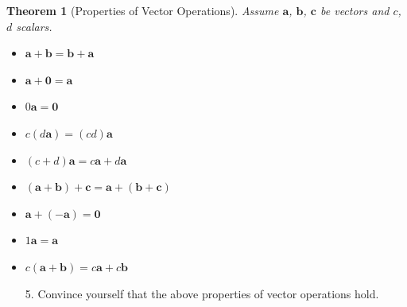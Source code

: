 \documentclass[12pt]{exam}
\newtheorem*{theorem}{Theorem}
\begin{document}
  \newpage
\begin{theorem}[Properties of Vector Operations]
    Assume $\mathbf{a}$, $\mathbf{b}$, $\mathbf{c}$ be vectors and $c$, $d$ scalars.
    \begin{multicols}{2}
        \begin{itemize}
         \item{
           $\mathbf{a}+\mathbf{b}=\mathbf{b}+\mathbf{a}$
         }
         \item{
           $\mathbf{a}+\mathbf{0}=\mathbf{a}$
         }
         \item{
           $0\mathbf{a}=\mathbf{0}$
         }
         \item{
           $c(d\mathbf{a})=(cd)\mathbf{a}$
         }
         \item{
           $(c+d)\mathbf{a}=c\mathbf{a}+d\mathbf{a}$
         }
         \item{
           $(\mathbf{a}+\mathbf{b})+\mathbf{c}=\mathbf{a}+(\mathbf{b}+\mathbf{c})$
         }
         \item{
           $\mathbf{a}+(-\mathbf{a})=\mathbf{0}$
         }
         \item{
           $1\mathbf{a}=\mathbf{a}$
         }
         \item{
           $c(\mathbf{a}+\mathbf{b})=c\mathbf{a}+c\mathbf{b}$
         }
       \end{itemize}
     \end{multicols}
  \end{theorem}
  \begin{enumerate}
    \item[5.]{
      Convince yourself that the above properties of vector operations hold.
    }
  \end{enumerate}
\end{document}
